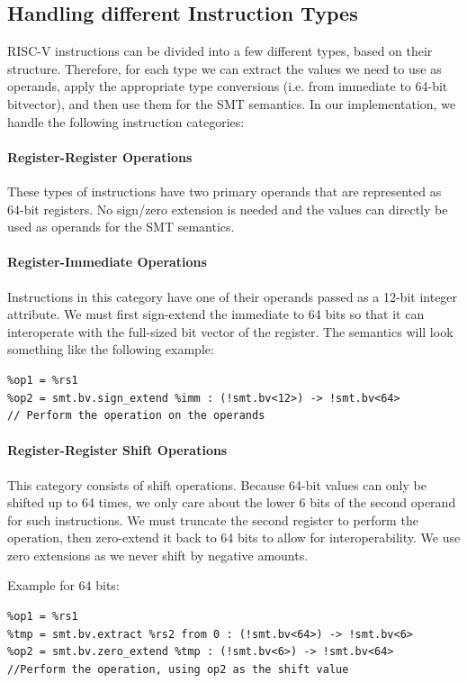 \subsection{Handling different Instruction Types}

RISC-V instructions can be divided into a few different types, based on their structure.
Therefore, for each type we can extract the values we need to use as operands, 
apply the appropriate type conversions (i.e. from immediate to 64-bit bitvector), and then use 
them for the SMT semantics.
%
In our implementation, we handle the following instruction categories: 

\paragraph{Register-Register Operations} These types of instructions have two primary operands that
are represented as 64-bit registers. No sign/zero extension is needed and the values can directly
be used as operands for the SMT semantics.

\paragraph{Register-Immediate Operations} Instructions in this category have one of their operands
passed as a 12-bit integer attribute. We must first sign-extend the immediate to 64 bits so that
it can interoperate with the full-sized bit vector of the register. The semantics will look 
something like the following example:

\begin{verbatim}
%op1 = %rs1
%op2 = smt.bv.sign_extend %imm : (!smt.bv<12>) -> !smt.bv<64>
// Perform the operation on the operands
\end{verbatim}

\paragraph{Register-Register Shift Operations}  This category consists of shift operations. 
Because 64-bit values can only be shifted up to 64 times, we only care about the lower 6 bits of the
second operand for such instructions. We must truncate the second register to perform the 
operation, then zero-extend it back to 64 bits to allow for interoperability. We use zero extensions
as we never shift by negative amounts.

Example for 64 bits:
\begin{verbatim}
%op1 = %rs1
%tmp = smt.bv.extract %rs2 from 0 : (!smt.bv<64>) -> !smt.bv<6>
%op2 = smt.bv.zero_extend %tmp : (!smt.bv<6>) -> !smt.bv<64>
//Perform the operation, using op2 as the shift value
\end{verbatim}

